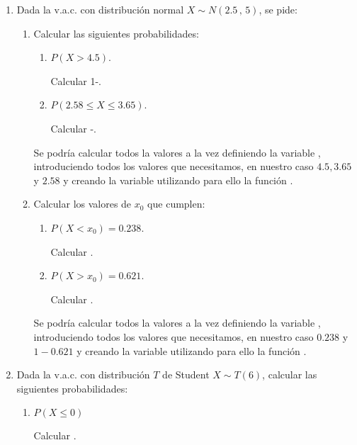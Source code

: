 \begin{enumerate}[leftmargin=*]
\item Dada la v.a.c. con distribución normal $X\sim N(2.5\,,\,5)$, se 
pide:
\begin{enumerate}
\item Calcular las siguientes probabilidades:
\begin{enumerate}
\item $P(X>4.5)$.
\begin{indicacion}
Calcular 1-.
\end{indicacion}

\item $P(2.58 \leq X \leq 3.65)$.
\begin{indicacion}
Calcular
-.
\end{indicacion}
\end{enumerate}

\begin{indicacion}
Se podría calcular todos la valores a la vez definiendo la variable 
, introduciendo todos los valores que
necesitamos, en nuestro caso $4.5, 3.65$ y $2.58$ y creando la variable 
 utilizando para ello la
función .
\end{indicacion}

\item Calcular los valores de $x_{0}$ que cumplen:
\begin{enumerate}
\item $P(X<x_{0})=0.238$.
\begin{indicacion}
Calcular .
\end{indicacion}

\item $P(X > x_{0})=0.621$.
\begin{indicacion}
Calcular .
\end{indicacion}
\end{enumerate}
\begin{indicacion}
Se podría calcular todos la valores a la vez definiendo la variable 
, introduciendo todos los valores que
necesitamos, en nuestro caso $0.238$ y $1-0.621$ y creando la variable 
 utilizando para ello la
función .
\end{indicacion}
\end{enumerate}


\item Dada la v.a.c. con distribución $T$ de Student $X\sim T(6)$, 
calcular las siguientes probabilidades:
\begin{enumerate}
\item $P(X\leq 0)$
\begin{indicacion}
Calcular .
\end{indicacion}


\end{enumerate}
\end{enumerate}
